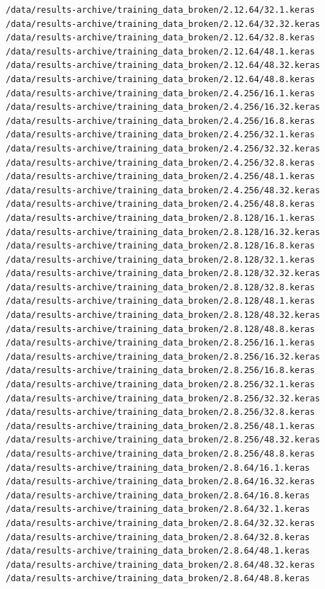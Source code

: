 \documentclass[12pt]{article}
\begin{document}
\begin{lstlisting}[style=logstyle, caption={List of failed trained models. See \ref{issues}}, label={lst:model-list}]
/data/results-archive/training_data_broken/2.12.64/32.1.keras
/data/results-archive/training_data_broken/2.12.64/32.32.keras
/data/results-archive/training_data_broken/2.12.64/32.8.keras
/data/results-archive/training_data_broken/2.12.64/48.1.keras
/data/results-archive/training_data_broken/2.12.64/48.32.keras
/data/results-archive/training_data_broken/2.12.64/48.8.keras
/data/results-archive/training_data_broken/2.4.256/16.1.keras
/data/results-archive/training_data_broken/2.4.256/16.32.keras
/data/results-archive/training_data_broken/2.4.256/16.8.keras
/data/results-archive/training_data_broken/2.4.256/32.1.keras
/data/results-archive/training_data_broken/2.4.256/32.32.keras
/data/results-archive/training_data_broken/2.4.256/32.8.keras
/data/results-archive/training_data_broken/2.4.256/48.1.keras
/data/results-archive/training_data_broken/2.4.256/48.32.keras
/data/results-archive/training_data_broken/2.4.256/48.8.keras
/data/results-archive/training_data_broken/2.8.128/16.1.keras
/data/results-archive/training_data_broken/2.8.128/16.32.keras
/data/results-archive/training_data_broken/2.8.128/16.8.keras
/data/results-archive/training_data_broken/2.8.128/32.1.keras
/data/results-archive/training_data_broken/2.8.128/32.32.keras
/data/results-archive/training_data_broken/2.8.128/32.8.keras
/data/results-archive/training_data_broken/2.8.128/48.1.keras
/data/results-archive/training_data_broken/2.8.128/48.32.keras
/data/results-archive/training_data_broken/2.8.128/48.8.keras
/data/results-archive/training_data_broken/2.8.256/16.1.keras
/data/results-archive/training_data_broken/2.8.256/16.32.keras
/data/results-archive/training_data_broken/2.8.256/16.8.keras
/data/results-archive/training_data_broken/2.8.256/32.1.keras
/data/results-archive/training_data_broken/2.8.256/32.32.keras
/data/results-archive/training_data_broken/2.8.256/32.8.keras
/data/results-archive/training_data_broken/2.8.256/48.1.keras
/data/results-archive/training_data_broken/2.8.256/48.32.keras
/data/results-archive/training_data_broken/2.8.256/48.8.keras
/data/results-archive/training_data_broken/2.8.64/16.1.keras
/data/results-archive/training_data_broken/2.8.64/16.32.keras
/data/results-archive/training_data_broken/2.8.64/16.8.keras
/data/results-archive/training_data_broken/2.8.64/32.1.keras
/data/results-archive/training_data_broken/2.8.64/32.32.keras
/data/results-archive/training_data_broken/2.8.64/32.8.keras
/data/results-archive/training_data_broken/2.8.64/48.1.keras
/data/results-archive/training_data_broken/2.8.64/48.32.keras
/data/results-archive/training_data_broken/2.8.64/48.8.keras

\end{lstlisting}
\end{document}
